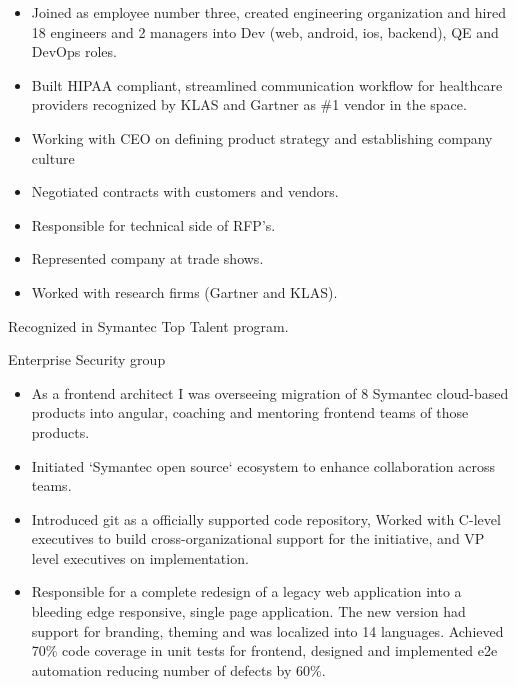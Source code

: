 \documentclass[11pt,a4paper,roman]{moderncv}       %
\begin{document}

\begin{itemize}
    \item Joined as employee number three, created engineering organization and hired 18 engineers and 2 managers into Dev (web, android, ios, backend), QE and DevOps roles. 
    \item Built HIPAA compliant, streamlined communication workflow for healthcare providers recognized by KLAS and Gartner as \#1 vendor in the space.
    \item Working with CEO on defining product strategy and establishing company culture 
    \item Negotiated contracts with customers and vendors.
    \item Responsible for technical side of RFP's.
    \item Represented company at trade shows.
    \item Worked with research firms (Gartner and KLAS).
\end{itemize}

\vspace{16pt}
\pagebreak


Recognized in Symantec Top Talent program.

\vspace{6pt}

Enterprise Security group
\begin{itemize}
    \item As a frontend architect I was overseeing migration of 8 Symantec cloud-based products into angular, coaching and mentoring frontend teams of those products. 
    \item Initiated `Symantec open source` ecosystem to enhance collaboration across teams. 
    \item Introduced git as a officially supported code repository, Worked with C-level executives to build cross-organizational support for the initiative, and VP level executives on implementation.
    \item Responsible for a complete redesign of a legacy web application into a bleeding edge responsive, single page application. The new version had support for branding, theming and was localized into 14 languages. Achieved 70\% code coverage in unit tests for frontend, designed and implemented e2e automation reducing number of defects by 60\%.
\end{itemize}
\end{document}
